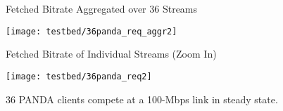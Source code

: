 \documentclass[conference]{IEEEtran}
\theoremstyle{plain}
\theoremstyle{definition}
\theoremstyle{plain}
\theoremstyle{plain}
\begin{document}
\begin{figure}
\begin{centering}
\hspace{-0.3in} \begin{minipage}[t]{1\columnwidth}\begin{center}
\hspace{0.2in}\footnotesize Fetched Bitrate Aggregated over 36 Streams\vspace{-0.23in}

\par\end{center}

\begin{center}
\texttt{[image: testbed/36panda\_req\_aggr2]}
\par\end{center}\end{minipage}
\par\end{centering}

\begin{centering}
\vspace{0.05in}
\hspace{-0.3in} \begin{minipage}[t]{1\columnwidth}\begin{center}
\hspace{0.2in}\footnotesize Fetched Bitrate of Individual Streams
(Zoom In)\vspace{-0.23in}

\par\end{center}

\begin{center}
\texttt{[image: testbed/36panda\_req2]}
\par\end{center}\end{minipage}
\par\end{centering}

\begin{centering}
\vspace{0in}

\par\end{centering}

\caption{36 PANDA clients compete at a 100-Mbps link in steady state. }


\label{Flo:36panda} \vspace{-0.05in}
\end{figure}
\end{document}
